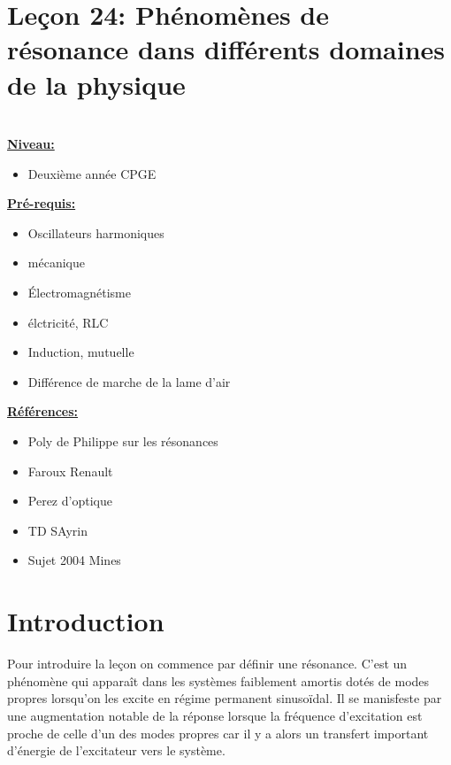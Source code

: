 \documentclass[french, a4paper, 10pt, twocolumn, landscape]{article}
\begin{document}
\clearpage 

\section*{Leçon 24: Phénomènes de résonance dans différents domaines de la physique}

\hrulefill\\

\noindent\underline{\textbf{Niveau:}} 
\begin{itemize}
    \item Deuxième année CPGE
\end{itemize}

\noindent\underline{\textbf{Pré-requis:}}
\begin{itemize}
    \item Oscillateurs harmoniques
    \item mécanique
    \item Électromagnétisme
    \item élctricité, RLC
    \item Induction, mutuelle
    \item Différence de marche de la lame d'air
\end{itemize}

\noindent\underline{\textbf{Références:}}

\begin{itemize}
    \item Poly de Philippe sur les résonances
    \item Faroux Renault 
    \item Perez d'optique
    \item TD SAyrin 
    \item Sujet 2004 Mines
\end{itemize}

\hrulefill

\section*{Introduction}

Pour introduire la leçon on commence par définir une résonance. C'est un phénomène qui apparaît dans les systèmes faiblement amortis dotés de modes propres lorsqu'on les excite en régime permanent sinusoïdal. Il se manisfeste par une augmentation notable de la réponse lorsque la fréquence d'excitation est proche de celle d'un des modes propres car il y a alors un transfert important d'énergie de l'excitateur vers le système.\medskip
 
\end{document}

